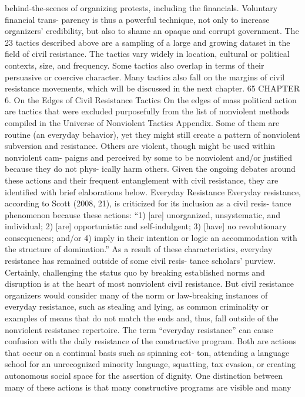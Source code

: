 \documentclass[twoside,a4paper,12pt,fleqn,openany]{extbook}
\begin{document}
behind-the-scenes of organizing protests, including the financials. Voluntary financial trans-
parency is thus a powerful technique, not only to increase organizers’ credibility, but also to
shame an opaque and corrupt government.
The 23 tactics described above are a sampling of a large and growing dataset in the
field of civil resistance. The tactics vary widely in location, cultural or political contexts, size,
and frequency. Some tactics also overlap in terms of their persuasive or coercive character.
Many tactics also fall on the margins of civil resistance movements, which will be discussed
in the next chapter.
65
CHAPTER 6. On the Edges of
Civil Resistance Tactics
On the edges of mass political action are tactics that were excluded purposefully from the
list of nonviolent methods compiled in the Universe of Nonviolent Tactics Appendix. Some
of them are routine (an everyday behavior), yet they might still create a pattern of nonviolent
subversion and resistance. Others are violent, though might be used within nonviolent cam-
paigns and perceived by some to be nonviolent and/or justified because they do not phys-
ically harm others. Given the ongoing debates around these actions and their frequent
entanglement with civil resistance, they are identified with brief elaborations below.
Everyday Resistance
Everyday resistance, according to Scott (2008, 21), is criticized for its inclusion as a civil resis-
tance phenomenon because these actions: “1) [are] unorganized, unsystematic, and individual;
2) [are] opportunistic and self-indulgent; 3) [have] no revolutionary consequences; and/or 4)
imply in their intention or logic an accommodation with the structure of domination.” As a
result of these characteristics, everyday resistance has remained outside of some civil resis-
tance scholars’ purview.
Certainly, challenging the status quo by breaking established norms and disruption is at
the heart of most nonviolent civil resistance. But civil resistance organizers would consider
many of the norm or law-breaking instances of everyday resistance, such as stealing and
lying, as common criminality or examples of means that do not match the ends and, thus, fall
outside of the nonviolent resistance repertoire.
The term “everyday resistance” can cause confusion with the daily resistance of the
constructive program. Both are actions that occur on a continual basis such as spinning cot-
ton, attending a language school for an unrecognized minority language, squatting, tax
evasion, or creating autonomous social space for the assertion of dignity. One distinction
between many of these actions is that many constructive programs are visible and many
\end{document}
